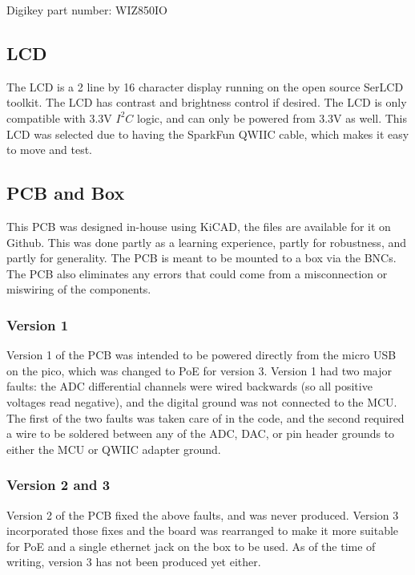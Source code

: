 \documentclass[11pt, letterpaper]{article}
\begin{document}
Digikey part number: WIZ850IO

\subsection{LCD}

The LCD is a 2 line by 16 character display running on the open source SerLCD toolkit. The LCD has contrast and brightness control if desired. The LCD is only compatible with 3.3V $I^2 C$ logic, and can only be powered from 3.3V as well. This LCD was selected due to having the SparkFun QWIIC cable, which makes it easy to move and test.

\subsection{PCB and Box}

This PCB was designed in-house using KiCAD, the files are available for it on Github. This was done partly as a learning experience, partly for robustness, and partly for generality. The PCB is meant to be mounted to a box via the BNCs. The PCB also eliminates any errors that could come from a misconnection or miswiring of the components.

\subsubsection{Version 1}

Version 1 of the PCB was intended to be powered directly from the micro USB on the pico, which was changed to PoE for version 3. Version 1 had two major faults: the ADC differential channels were wired backwards (so all positive voltages read negative), and the digital ground was not connected to the MCU. The first of the two faults was taken care of in the code, and the second required a wire to be soldered between any of the ADC, DAC, or pin header grounds to either the MCU or QWIIC adapter ground.

\subsubsection{Version 2 and 3}

Version 2 of the PCB fixed the above faults, and was never produced. Version 3 incorporated those fixes and the board was rearranged to make it more suitable for PoE and a single ethernet jack on the box to be used. As of the time of writing, version 3 has not been produced yet either.
\end{document}
